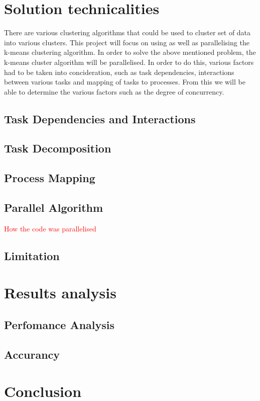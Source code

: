 \documentclass[12pt]{article}
\begin{document}
	\section{Solution technicalities}
  		\begin{flushleft}
  			There are various clustering algorithms that could be used to cluster set of data into various clusters. This project will focus on using as well as parallelising the k-means clustering algorithm. In order to solve the above mentioned problem, the k-means cluster algorithm will be parallelised. In order to do this, various factors had to be taken into concideration, such as task dependencies, interactions between various tasks and mapping of tasks to processes. From this we will be able to determine the various factors such as the degree of concurrency.
    	\end{flushleft}
    	
    	\subsection{Task Dependencies and Interactions}
    	
    	\subsection{Task Decomposition}
    	
    	\subsection{Process Mapping}
    	
    	\subsection{Parallel Algorithm}
    	\textcolor{red}{How the code was parallelised}
    	
    	\subsection{Limitation}

  	\section{Results analysis}
    	\begin{flushleft}
			
    	\end{flushleft}
    	
    	\subsection{Perfomance Analysis}
    	
    	\subsection{Accurancy}

	\section{Conclusion}
    	\begin{flushleft}
			
    	\end{flushleft}
\end{document}
